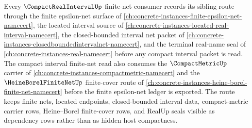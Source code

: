 Every $\CompactRealIntervalUp$ finite-net consumer records its sibling route through the finite epsilon-net surface of \autoref{ch:concrete-instances-finite-epsilon-net-namecert}, the located interval source of \autoref{ch:concrete-instances-located-real-interval-namecert}, the closed-bounded interval net packet of \autoref{ch:concrete-instances-closedboundedintervalnet-namecert}, and the terminal real-name seal of \autoref{ch:concrete-instances-real-namecert} before any compact interval packet is read. The compact interval finite-net read also consumes the $\CompactMetricUp$ carrier of \autoref{ch:concrete-instances-compactmetric-namecert} and the $\HeineBorelFiniteNetUp$ finite-cover route of \autoref{ch:concrete-instances-heine-borel-finite-net-namecert} before the finite epsilon-net ledger is exported. The route keeps finite nets, located endpoints, closed-bounded interval data, compact-metric carrier rows, Heine--Borel finite-cover rows, and RealUp seals visible as dependency rows rather than as hidden host compactness.
